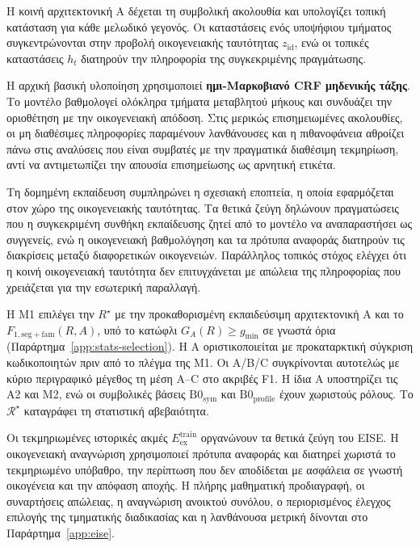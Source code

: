 \documentclass[11pt,a4paper]{article}
\begin{document}
Η κοινή αρχιτεκτονική A δέχεται τη συμβολική ακολουθία και υπολογίζει τοπική κατάσταση για κάθε μελωδικό γεγονός. Οι καταστάσεις ενός υποψήφιου τμήματος συγκεντρώνονται στην προβολή οικογενειακής ταυτότητας $z_{\mathrm{id}}$, ενώ οι τοπικές καταστάσεις $h_t$ διατηρούν την πληροφορία της συγκεκριμένης πραγμάτωσης.

Η αρχική βασική υλοποίηση χρησιμοποιεί \textbf{ημι-Μαρκοβιανό CRF μηδενικής τάξης}. Το μοντέλο βαθμολογεί ολόκληρα τμήματα μεταβλητού μήκους και συνδυάζει την οριοθέτηση με την οικογενειακή απόδοση. Στις μερικώς επισημειωμένες ακολουθίες, οι μη διαθέσιμες πληροφορίες παραμένουν λανθάνουσες και η πιθανοφάνεια αθροίζει πάνω στις αναλύσεις που είναι συμβατές με την πραγματικά διαθέσιμη τεκμηρίωση, αντί να αντιμετωπίζει την απουσία επισημείωσης ως αρνητική ετικέτα.

Τη δομημένη εκπαίδευση συμπληρώνει η σχεσιακή εποπτεία, η οποία εφαρμόζεται στον χώρο της οικογενειακής ταυτότητας. Τα θετικά ζεύγη δηλώνουν πραγματώσεις που η συγκεκριμένη συνθήκη εκπαίδευσης ζητεί από το μοντέλο να αναπαραστήσει ως συγγενείς, ενώ η οικογενειακή βαθμολόγηση και τα πρότυπα αναφοράς διατηρούν τις διακρίσεις μεταξύ διαφορετικών οικογενειών. Παράλληλος τοπικός στόχος ελέγχει ότι η κοινή οικογενειακή ταυτότητα δεν επιτυγχάνεται με απώλεια της πληροφορίας που χρειάζεται για την εσωτερική παραλλαγή.

Η M1 επιλέγει την $R^\star$ με την προκαθορισμένη εκπαιδεύσιμη αρχιτεκτονική A και το $F_{1,\mathrm{seg+fam}}(R,A)$, υπό το κατώφλι $G_A(R)\ge g_{\min}$ σε γνωστά όρια (Παράρτημα~\ref{app:stats-selection}). Η A οριστικοποιείται με προκαταρκτική σύγκριση κωδικοποιητών πριν από το πλέγμα της Μ1. Οι A/B/C συγκρίνονται αυτοτελώς με κύριο περιγραφικό μέγεθος τη μέση A--C στο ακριβές F1. Η ίδια A υποστηρίζει τις Α2 και Μ2, ενώ οι συμβολικές βάσεις $\mathrm{B0}_{\mathrm{sym}}$ και $\mathrm{B0}_{\mathrm{profile}}$ έχουν χωριστούς ρόλους. Το $\mathcal R^\star$ καταγράφει τη στατιστική αβεβαιότητα.

Οι τεκμηριωμένες ιστορικές ακμές $E_{\mathrm{ex}}^{\mathrm{train}}$ οργανώνουν τα θετικά ζεύγη του EISE. Η οικογενειακή αναγνώριση χρησιμοποιεί πρότυπα αναφοράς και διατηρεί χωριστά το τεκμηριωμένο υπόβαθρο, την περίπτωση που δεν αποδίδεται με ασφάλεια σε γνωστή οικογένεια και την απόφαση αποχής. Η πλήρης μαθηματική προδιαγραφή, οι συναρτήσεις απώλειας, η αναγνώριση ανοικτού συνόλου, ο περιορισμένος έλεγχος επιλογής της τμηματικής διαδικασίας και η λανθάνουσα μετρική δίνονται στο Παράρτημα~\ref{app:eise}.
\end{document}
